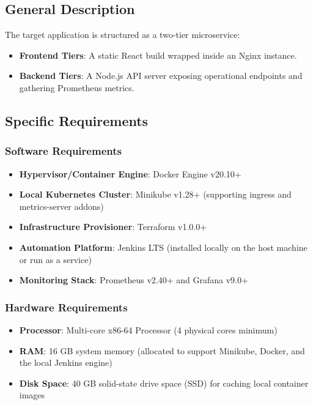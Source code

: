 \documentclass[12pt,a4paper]{article}
\begin{document}
\subsection{General Description}
The target application is structured as a two-tier microservice:
\begin{itemize}
    \item \textbf{Frontend Tiers}: A static React build wrapped inside an Nginx instance.
    \item \textbf{Backend Tiers}: A Node.js API server exposing operational endpoints and gathering Prometheus metrics.
\end{itemize}

\subsection{Specific Requirements}
\subsubsection{Software Requirements}
\begin{itemize}
    \item \textbf{Hypervisor/Container Engine}: Docker Engine v20.10+
    \item \textbf{Local Kubernetes Cluster}: Minikube v1.28+ (supporting ingress and metrics-server addons)
    \item \textbf{Infrastructure Provisioner}: Terraform v1.0.0+
    \item \textbf{Automation Platform}: Jenkins LTS (installed locally on the host machine or run as a service)
    \item \textbf{Monitoring Stack}: Prometheus v2.40+ and Grafana v9.0+
\end{itemize}

\subsubsection{Hardware Requirements}
\begin{itemize}
    \item \textbf{Processor}: Multi-core x86-64 Processor (4 physical cores minimum)
    \item \textbf{RAM}: 16 GB system memory (allocated to support Minikube, Docker, and the local Jenkins engine)
    \item \textbf{Disk Space}: 40 GB solid-state drive space (SSD) for caching local container images
\end{itemize}
\end{document}
